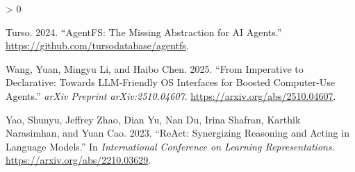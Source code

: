 \documentclass[
  11pt,
]{article}
\newlength{\cslhangindent}
\newenvironment{CSLReferences}[2] %
 {%
  \setlength{\parindent}{0pt}
  \ifodd #1 \everypar{\setlength{\hangindent}{\cslhangindent}}\ignorespaces\fi
  \ifnum #2 > 0
  \setlength{\parskip}{#2\baselineskip}
  \fi
 }%
 {}
\begin{document}
\begin{CSLReferences}{1}{0}
\leavevmode{}%
Turso. 2024. {``{AgentFS}: The Missing Abstraction for {AI} Agents.''}
\url{https://github.com/tursodatabase/agentfs}.

\leavevmode{}%
Wang, Yuan, Mingyu Li, and Haibo Chen. 2025. {``From Imperative to
Declarative: Towards {LLM}-Friendly {OS} Interfaces for Boosted
Computer-Use Agents.''} \emph{arXiv Preprint arXiv:2510.04607}.
\url{https://arxiv.org/abs/2510.04607}.

\leavevmode{}%
Yao, Shunyu, Jeffrey Zhao, Dian Yu, Nan Du, Irina Shafran, Karthik
Narasimhan, and Yuan Cao. 2023. {``{ReAct}: Synergizing Reasoning and
Acting in Language Models.''} In \emph{International Conference on
Learning Representations}. \url{https://arxiv.org/abs/2210.03629}.

\end{CSLReferences}
\end{document}

